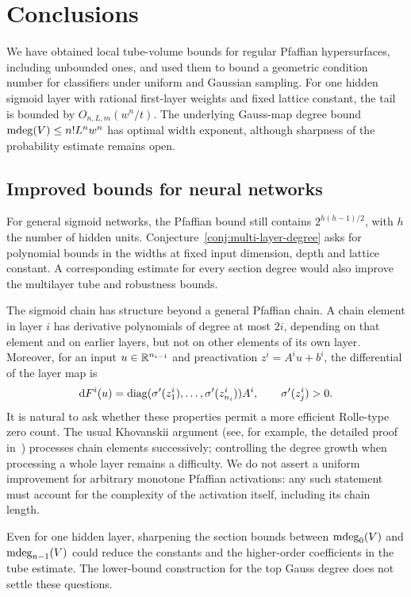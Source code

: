 \section{Conclusions}\label{sec:conclusions}
We have obtained local tube-volume bounds for regular Pfaffian hypersurfaces, including unbounded ones, and used them to bound a geometric condition number for classifiers under uniform and Gaussian sampling. For one hidden sigmoid layer with rational first-layer weights and fixed lattice constant, the tail is bounded by $O_{n,L,m}(w^n/t)$. The underlying Gauss-map degree bound $\operatorname{\mathrm{mdeg}}(V)\le n!L^nw^n$ has optimal width exponent, although sharpness of the probability estimate remains open.

\subsection{Improved bounds for neural networks}\label{subsec:improved-nn}
For general sigmoid networks, the Pfaffian bound still contains $2^{h(h-1)/2}$, with $h$ the number of hidden units. Conjecture~\ref{conj:multi-layer-degree} asks for polynomial bounds in the widths at fixed input dimension, depth and lattice constant. A corresponding estimate for every section degree would also improve the multilayer tube and robustness bounds.

The sigmoid chain has structure beyond a general Pfaffian chain. A chain element in layer $i$ has derivative polynomials of degree at most $2i$, depending on that element and on earlier layers, but not on other elements of its own layer. Moreover, for an input $u\in\mathbb{R}^{n_{i-1}}$ and preactivation $z^i=A^iu+b^i$, the differential of the layer map is
\[
\mathrm{d}{F^i}(u)=\operatorname{diag}(\sigma'(z^i_1),\dots,\sigma'(z^i_{n_i}))A^i,
\qquad \sigma'(z^i_j)>0.
\]
It is natural to ask whether these properties permit a more efficient Rolle-type zero count. The usual Khovanskii argument (see, for example, the detailed proof in~\cite{lotz2026khovanskii}) processes chain elements successively; controlling the degree growth when processing a whole layer remains a difficulty. We do not assert a uniform improvement for arbitrary monotone Pfaffian activations: any such statement must account for the complexity of the activation itself, including its chain length.

Even for one hidden layer, sharpening the section bounds between $\operatorname{\mathrm{mdeg}}_0(V)$ and $\operatorname{\mathrm{mdeg}}_{n-1}(V)$ could reduce the constants and the higher-order coefficients in the tube estimate. The lower-bound construction for the top Gauss degree does not settle these questions.

